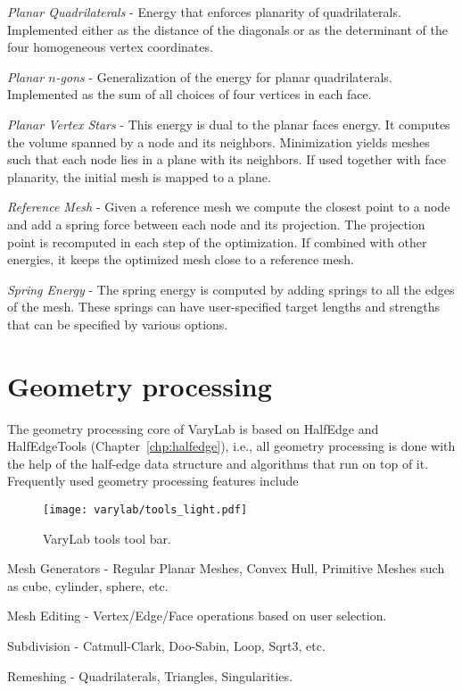 \documentclass[Thesis.tex]{subfiles}
\begin{document}
\begin{compactitem}[$\bullet$]
\item \emph{Planar Quadrilaterals} - Energy that enforces planarity of quadrilaterals. Implemented either as the distance of the diagonals or as the determinant of the four homogeneous vertex coordinates.
\item \emph{Planar $n$-gons} - Generalization of the energy for planar quadrilaterals. Implemented as the sum of all choices of four vertices in each face.
\item \emph{Planar Vertex Stars} - This energy is dual to the planar faces energy. It computes the volume spanned by a node and its neighbors. Minimization yields meshes such that each node lies in a plane with its neighbors. If used together with face planarity, the initial mesh is mapped to a plane.
\item \emph{Reference Mesh} - Given a reference mesh we compute the closest point to a node and add a spring force between each node and its projection. The projection point is recomputed in each step of the optimization. If combined with other energies, it keeps the optimized mesh close to a reference mesh.
\item \emph{Spring Energy} - The spring energy is computed by adding springs to all the edges of the mesh. These springs can have user-specified target lengths and strengths that can be specified by various options.
\end{compactitem}

\section{Geometry processing}

The geometry processing core of {\sc VaryLab} is based on {\sc HalfEdge} and {\sc HalfEdgeTools} (Chapter~\ref{chp:halfedge}), i.e., all geometry processing is done with the help of the half-edge data structure and algorithms that run on top of it. Frequently used geometry processing features include

\begin{figure}
    \begin{center}
    \texttt{[image: varylab/tools\_light.pdf]}
    \caption{{\sc VaryLab} tools tool bar.}
    \label{fig:varylab_tools_ui}
    \end{center}
\end{figure}

\begin{compactitem}[$\bullet$]
\item Mesh Generators - Regular Planar Meshes, Convex Hull, Primitive Meshes such as cube, cylinder, sphere, etc.
\item Mesh Editing - Vertex/Edge/Face operations based on user selection.
\item Subdivision - Catmull-Clark, Doo-Sabin, Loop, Sqrt3, etc.
\item Remeshing - Quadrilaterals, Triangles, Singularities.
\end{compactitem}
\end{document}
